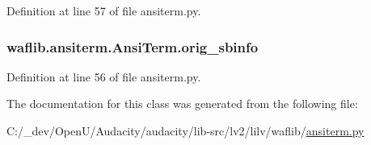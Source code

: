 Definition at line 57 of file ansiterm.\+py.

\subsubsection[{\texorpdfstring{orig\+\_\+sbinfo}{orig_sbinfo}}]{\setlength{\rightskip}{0pt plus 5cm}waflib.\+ansiterm.\+Ansi\+Term.\+orig\+\_\+sbinfo}\hypertarget{classwaflib_1_1ansiterm_1_1_ansi_term_a046a1bf40ae2d55263bf7c692612e64d}{}\label{classwaflib_1_1ansiterm_1_1_ansi_term_a046a1bf40ae2d55263bf7c692612e64d}


Definition at line 56 of file ansiterm.\+py.



The documentation for this class was generated from the following file\+:\begin{DoxyCompactItemize}
\item 
C\+:/\+\_\+dev/\+Open\+U/\+Audacity/audacity/lib-\/src/lv2/lilv/waflib/\hyperlink{lilv_2waflib_2ansiterm_8py}{ansiterm.\+py}\end{DoxyCompactItemize}
